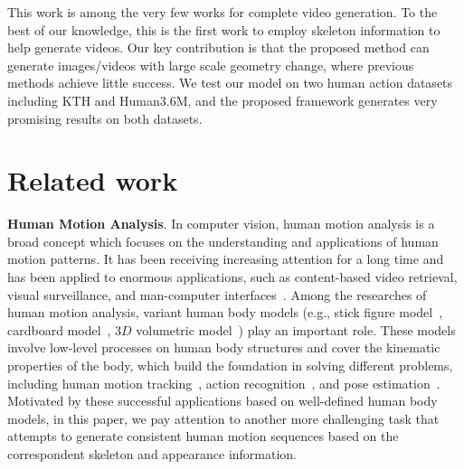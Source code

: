 \documentclass[journal]{IEEEtran}
\begin{document}
This work is among the very few works for complete video generation. To the best of our knowledge, this is the first work to employ skeleton information to help generate videos. Our key contribution is that the proposed method can generate images/videos with large scale geometry change, where previous methods achieve little success. We test our model on two human action datasets including KTH and Human3.6M, and the proposed framework generates very promising results on both datasets.

\section{Related work}
\textbf{Human Motion Analysis}. In computer vision, human motion analysis is a broad concept which focuses on the understanding and applications of human motion patterns. It has been receiving increasing attention for a long time and has been applied to enormous applications, such as content-based video retrieval, visual surveillance, and man-computer interfaces~\cite{poppe2007vision,aggarwal1997human,ji2010advances}. Among the researches of human motion analysis, variant human body models (e.g., stick figure model~\cite{ju1996cardboard,howe1999bayesian}, cardboard model~\cite{rashid1980towards}, $3D$ volumetric model~\cite{kehl2006markerless}) play an important role. These models involve low-level processes on human body structures and cover the kinematic properties of the body, which build the foundation in solving different problems, including human motion tracking~\cite{huang2002model,ong2006viewpoint,mikic2003human}, action recognition~\cite{du2015hierarchical,papadopoulos2014real,grushin2013robust,gong2014structured}, and pose estimation~\cite{andriluka2009pictorial,andriluka20142d,toshev2014deeppose}. Motivated by these successful applications based on well-defined human body models, in this paper, we pay attention to another more challenging task that attempts to generate consistent human motion sequences based on the correspondent skeleton and appearance information.
\end{document}
